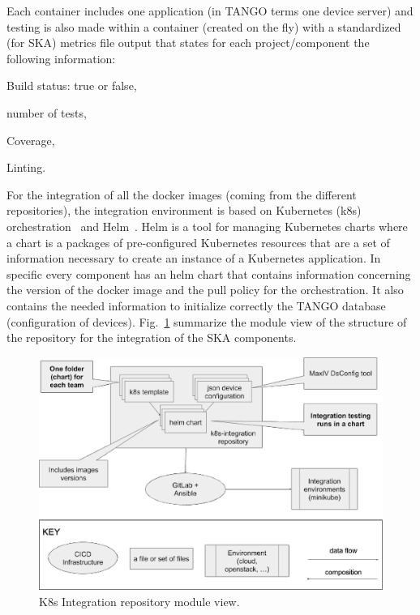 \documentclass[a4paper,
               keeplastbox,   %
               ]{jacow}
\begin{document}
Each container includes one application (in TANGO terms one device server) and testing is also made within a container (created on the fly) with a standardized (for SKA) metrics file output that states for each project/component the following information: 
\begin{Itemize}
    \item Build status: true or false,
    \item number of tests,
    \item Coverage,
    \item Linting.
\end{Itemize}
For the integration of all the docker images (coming from the different repositories), the integration environment is based on Kubernetes (k8s) orchestration~\cite{kubernetes} and Helm~\cite{helm}. Helm is a tool for managing Kubernetes charts where a chart is a packages of pre-configured Kubernetes resources that are a set of information necessary to create an instance of a Kubernetes application. 
In specific every component has an helm chart that contains information concerning the version of the docker image and the pull policy for the orchestration. It also contains the needed information to initialize correctly the TANGO database (configuration of devices). Fig.~\ref{fig:k8sIntegrationRepo} summarize the module view of the structure of the repository for the integration of the SKA components. 
\begin{figure}[!htb]
   \centering
   \includegraphics*[width=1\columnwidth]{k8sIntegrationRepo}
   \caption{K8s Integration repository module view.}
   \label{fig:k8sIntegrationRepo}
\end{figure}
\end{document}
